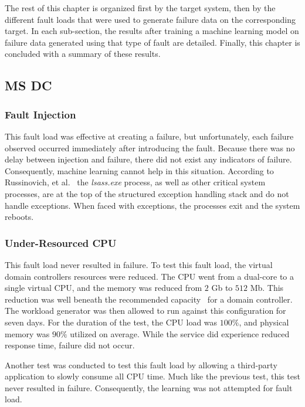 The rest of this chapter is organized first by the target system, then by the
different fault loads that were used to generate failure data on the
corresponding target.  In each sub-section, the results after training a
machine learning model on failure data generated using that type of fault are
detailed.  Finally, this chapter is concluded with a summary of these results.

\subsection{\ac{MS} \ac{DC}}
\subsubsection{Fault Injection}
This fault load was effective at creating a failure, but unfortunately, each
failure observed occurred immediately after introducing the fault.  Because
there was no delay between injection and failure, there did not exist any
indicators of failure.  Consequently, machine learning cannot help in this
situation.  According to Russinovich, et al.~\cite{russinovich2009} the
\emph{lsass.exe} process, as well as other critical system processes, are at
the top of the structured exception handling stack and do not handle
exceptions.  When faced with exceptions, the processes exit and the system
reboots.

\subsubsection{Under-Resourced \ac{CPU}}
This fault load never resulted in failure.  To test this fault load, the
virtual domain controllers resources were reduced.  The \ac{CPU} went from a
dual-core to a single virtual CPU, and the memory was reduced from $2$ Gb to
$512$ Mb.  This reduction was well beneath the recommended
capacity~\cite{mak12} for a domain controller.  The workload generator was then
allowed to run against this configuration for seven days.  For the duration of
the test, the \ac{CPU} load was $100\%$, and physical memory was $90\%$
utilized on average.  While the service did experience reduced response time,
failure did not occur.

Another test was conducted to test this fault load by allowing a third-party
application to slowly consume all \ac{CPU} time.  Much like the previous test,
this test never resulted in failure.  Consequently, the learning was not
attempted for fault load.

